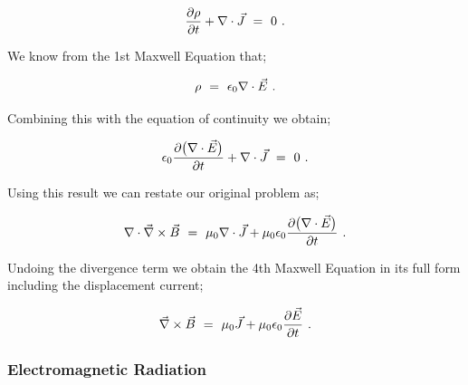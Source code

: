 \documentclass{article}
\begin{document}
\begin{equation} \label{eq:51}
\frac{\partial{\rho}}{\partial{t}} + \nabla\cdot\vec{J} \hspace{0.125cm} = \hspace{0.125cm} 0 \hspace{0.125cm} .
\end{equation}

We know from the 1st Maxwell Equation that;

\begin{equation} \label{eq:51}
\rho \hspace{0.125cm} = \hspace{0.125cm} \epsilon_{0} \nabla\cdot\vec{E} \hspace{0.125cm} .  
\end{equation}

Combining this with the equation of continuity we obtain;

\begin{equation} \label{eq:51}
\epsilon_{0} \frac{\partial\big(\nabla\cdot{\vec{E}}\big)}{\partial{t}} + \nabla\cdot\vec{J} \hspace{0.125cm} = \hspace{0.125cm} 0 \hspace{0.125cm} .
\end{equation}

Using this result we can restate our original problem as;

\begin{equation} \label{eq:51}
\nabla\cdot\vec{\nabla} \times \vec{B} \hspace{0.125cm} = \hspace{0.125cm} \mu_{0} \nabla\cdot\vec{J} + \mu_{0} \epsilon_{0} \frac{\partial\big(\nabla\cdot{\vec{E}}\big)}{\partial{t}} \hspace{0.125cm} .
\end{equation}

Undoing the divergence term we obtain the 4th Maxwell Equation in its full form including the displacement current;

\begin{equation} \label{eq:51}
\vec{\nabla} \times \vec{B} \hspace{0.125cm} = \hspace{0.125cm} \mu_{0} \vec{J} + \mu_{0} \epsilon_{0} \frac{\partial{\vec{E}}}{\partial{t}} \hspace{0.125cm} .
\end{equation}

\subsubsection{Electromagnetic Radiation}
\end{document}
